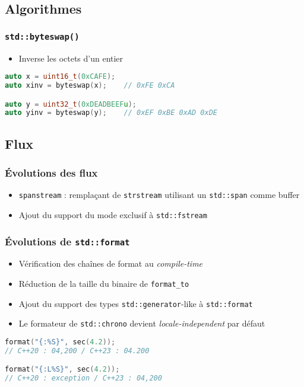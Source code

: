 \documentclass[C++.tex]{subfiles}
\begin{document}
\subsection*{Algorithmes}
\begin{frame}[fragile]
	\frametitle{\lstinline|std::byteswap()|}
	\begin{itemize}
		\item Inverse les octets d'un entier
	\end{itemize}

	\begin{lstlisting}[language=C++]
auto x = uint16_t(0xCAFE);
auto xinv = byteswap(x);	// 0xFE 0xCA

auto y = uint32_t(0xDEADBEEFu);
auto yinv = byteswap(y);	// 0xEF 0xBE 0xAD 0xDE\end{lstlisting}
\end{frame}

\subsection*{Flux}
\begin{frame}[fragile]
	\frametitle{Évolutions des flux}
	\begin{itemize}
		\item \lstinline|spanstream| : remplaçant de \lstinline|strstream| utilisant un \lstinline|std::span| comme buffer


		\item Ajout du support du mode exclusif à \lstinline|std::fstream|
	\end{itemize}
\end{frame}

\begin{frame}[fragile]
	\frametitle{Évolutions de \lstinline|std::format|}
	\begin{itemize}
		\item Vérification des chaînes de format au \textit{compile-time}
		\item Réduction de la taille du binaire de \lstinline|format_to|
		\item Ajout du support des types \lstinline|std::generator|-like à \lstinline|std::format|
		\item Le formateur de \lstinline|std::chrono| devient \textit{locale-independent} par défaut


	\end{itemize}

	\begin{lstlisting}[language=C++]
format("{:%S}", sec(4.2));
// C++20 : 04,200 / C++23 : 04.200

format("{:L%S}", sec(4.2));
// C++20 : exception / C++23 : 04,200\end{lstlisting}
\end{frame}
\end{document}
